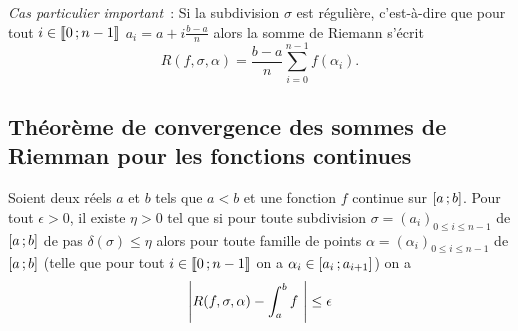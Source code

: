 \emph{Cas particulier important}~: Si la subdivision $\sigma$ est régulière, c'est-à-dire que pour tout $i \in \mathopen{\llbracket}0\mathclose{}\mathpunct{};n-1\mathclose{\rrbracket}$ $a_i=a+i \frac{b-a}{n}$ alors la somme de Riemann s'écrit
\begin{equation}
  R(f,\sigma,\alpha) = \frac{b-a}{n} \sum_{i=0}^{n-1}f(\alpha_i).
\end{equation}

\subsection{Théorème de convergence des sommes de Riemman pour les fonctions continues}

\begin{theo}
  Soient deux réels $a$ et $b$ tels que $a<b$ et une fonction $f$ continue sur $\left[ a \, ;  b \right]$. Pour tout $\epsilon >0$, il existe $\eta >0$ tel que si pour toute subdivision $\sigma=(a_i)_{0 \leq i \leq n-1}$ de $\left[ a \, ;  b \right]$ de pas $\delta(\sigma) \leq \eta$ alors pour toute famille de points $\alpha=(\alpha_i)_{0 \leq i \leq n-1}$ de $\left[ a \, ;  b \right]$ (telle que pour tout $i \in \mathopen{\llbracket}0\mathclose{}\mathpunct{};n-1\mathclose{\rrbracket}$ on a $\alpha_i \in \left[ a_i \, ;  a_{i+1} \right]$) on a
  \begin{equation}
    \left\lvert R(f,\sigma,\alpha)- \int_a^b f~\right\rvert \leq \epsilon
  \end{equation}
\end{theo}
